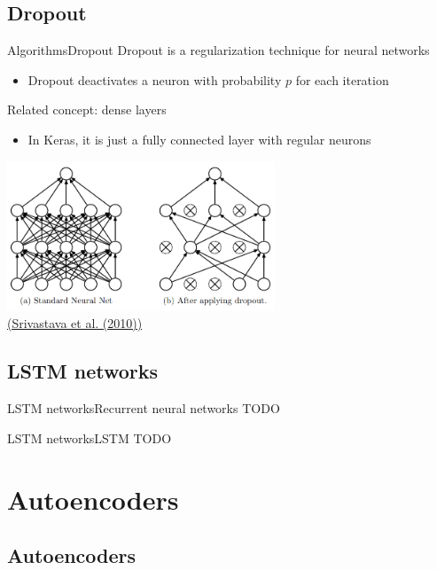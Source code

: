 \documentclass[10pt,compress]{beamer} %
\begin{document}
\subsection{Dropout}

\begin{frame}{Algorithms}{Dropout}
	\alert{Dropout} is a regularization technique for neural networks
	\begin{itemize}
		\item Dropout deactivates a neuron with probability $p$ for each iteration
	\end{itemize}

	Related concept: \alert{dense layers}
	\begin{itemize}
		\item In Keras, it is just a fully connected layer with regular neurons
	\end{itemize}

	\centering
        \includegraphics[width=0.6\textwidth]{figs/dropout.png}\\
	\scriptsize\href{https://jmlr.org/papers/volume15/srivastava14a.old/srivastava14a.pdf}{(Srivastava et al. (2010))}
\end{frame}


\subsection{LSTM networks}

\begin{frame}{LSTM networks}{Recurrent neural networks}
    TODO
\end{frame}

\begin{frame}{LSTM networks}{LSTM}
    TODO
\end{frame}

\section{Autoencoders}

\subsection{Autoencoders}
\end{document}

